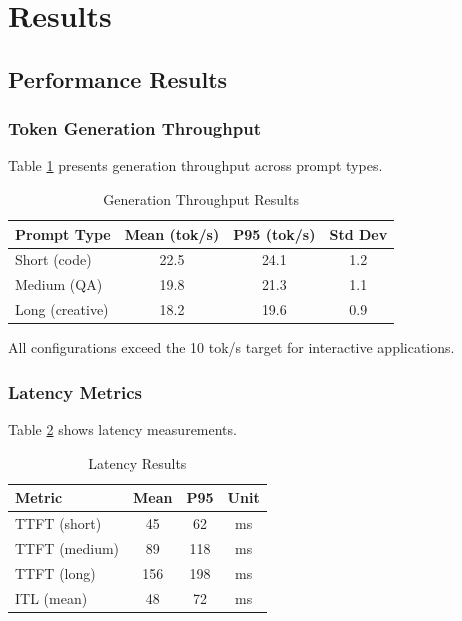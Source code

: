 \section{Results}
\label{sec:results}

\subsection{Performance Results}

\subsubsection{Token Generation Throughput}

Table \ref{tab:throughput_results} presents generation throughput across prompt types.

\begin{table}[h]
\centering
\caption{Generation Throughput Results}
\label{tab:throughput_results}
\begin{tabular}{lccc}
\toprule
\textbf{Prompt Type} & \textbf{Mean (tok/s)} & \textbf{P95 (tok/s)} & \textbf{Std Dev} \\
\midrule
Short (code) & 22.5 & 24.1 & 1.2 \\
Medium (QA) & 19.8 & 21.3 & 1.1 \\
Long (creative) & 18.2 & 19.6 & 0.9 \\
\bottomrule
\end{tabular}
\end{table}

All configurations exceed the 10 tok/s target for interactive applications.

\subsubsection{Latency Metrics}

Table \ref{tab:latency_results} shows latency measurements.

\begin{table}[h]
\centering
\caption{Latency Results}
\label{tab:latency_results}
\begin{tabular}{lccc}
\toprule
\textbf{Metric} & \textbf{Mean} & \textbf{P95} & \textbf{Unit} \\
\midrule
TTFT (short) & 45 & 62 & ms \\
TTFT (medium) & 89 & 118 & ms \\
TTFT (long) & 156 & 198 & ms \\
ITL (mean) & 48 & 72 & ms \\
\bottomrule
\end{tabular}
\end{table}

